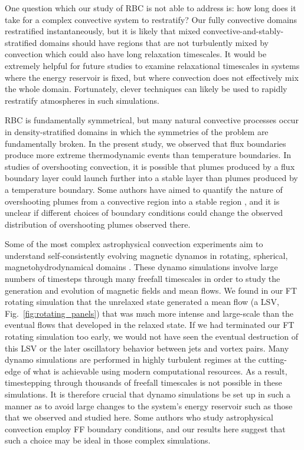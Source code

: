 One question which our study of RBC is not able to address is: how long does it take for a complex convective system to restratify?
Our fully convective domains restratified instantaneously, but it is likely that mixed convective-and-stably-stratified domains \citep{brummell&all2002, kapyla&all2019, pratt&all2017, korre&all2019} should have regions that are not turbulently mixed by convection which could also have long relaxation timescales.
It would be extremely helpful for future studies to examine relaxational timescales in systems where the energy reservoir is fixed, but where convection does not effectively mix the whole domain.
Fortunately, clever techniques \citep[e.g., as we explored in][]{anders&all2018} can likely be used to rapidly restratify atmospheres in such simulations.

RBC is fundamentally symmetrical, but many natural convective processes occur in density-stratified domains in which the symmetries of the problem are fundamentally broken.
In the present study, we observed that flux boundaries produce more extreme thermodynamic events than temperature boundaries.
In studies of overshooting convection, it is possible that plumes produced by a flux boundary layer could launch further into a stable layer than plumes produced by a temperature boundary.
Some authors have aimed to quantify the nature of overshooting plumes from a convective region into a stable region \citep{pratt&all2017, korre&all2019}, and it is unclear if different choices of boundary conditions could change the observed distribution of overshooting plumes observed there.

Some of the most complex astrophysical convection experiments aim to understand self-consistently evolving magnetic dynamos in rotating, spherical, magnetohydrodynamical domains \citep{brown&all2010, yadav&all2016, strugarek&all2017, strugarek&all2018}.
These dynamo simulations involve large numbers of timesteps through many freefall timescales in order to study the generation and evolution of magnetic fields and mean flows.
We found in our FT rotating simulation that the unrelaxed state generated a mean flow (a LSV, Fig.~\ref{fig:rotating_panels}) that was much more intense and large-scale than the eventual flows that developed in the relaxed state.
If we had terminated our FT rotating simulation too early, we would not have seen the eventual destruction of this LSV or the later oscillatory behavior between jets and vortex pairs.
Many dynamo simulations are performed in highly turbulent regimes at the cutting-edge of what is achievable using modern computational resources.
As a result, timestepping through thousands of freefall timescales is not possible in these simulations.
It is therefore crucial that dynamo simulations be set up in such a manner as to avoid large changes to the system's energy reservoir such as those that we observed and studied here.
Some authors who study astrophysical convection \citep{featherstone&hindman2016a, strugarek&all2018, bordwell&all2018, matilsky&all2019} employ FF boundary conditions, and our results here suggest that such a choice may be ideal in those complex simulations.

